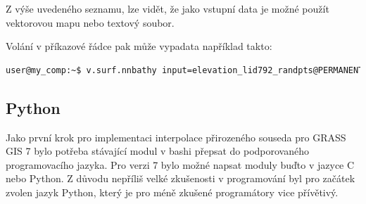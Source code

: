 \documentclass[12pt,a4paper]{article}
\begin{document}
Z výše uvedeného seznamu, lze vidět, že jako vstupní data je možné použít vektorovou mapu nebo textový soubor.


Volání v příkazové řádce pak může vypadata například takto:
\begin{lstlisting}[language=bash,caption={bash version}]
user@my_comp:~$ v.surf.nnbathy input=elevation_lid792_randpts@PERMANENT output=raster_map zcolumn=value alg=nn
\end{lstlisting}

\newpage
\subsection{Python}
Jako první krok pro implementaci interpolace přirozeného souseda pro GRASS GIS 7 bylo potřeba stávající modul v bashi přepsat do podporovaného programovacího jazyka. Pro verzi 7 bylo možné napsat moduly buďto v jazyce C nebo Python. Z důvodu nepříliš velké zkušenosti v programování byl pro začátek zvolen jazyk Python, který je pro méně zkušené programátory vice přívětivý. 
\end{document}
